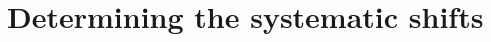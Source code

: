 \documentclass[10pt,a4paper]{article}
\begin{document}

\section{Determining the systematic shifts}\label{eq:sysshifts}
\end{document}
